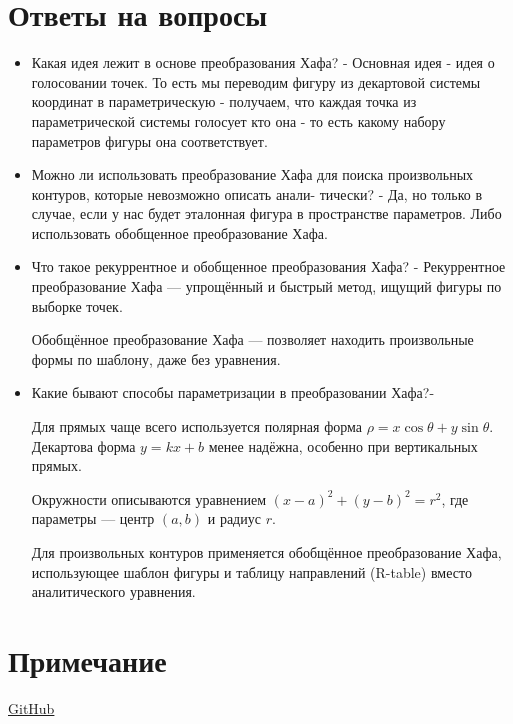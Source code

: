 \documentclass[a4paper,12pt]{article}
\begin{document}
	\section{Ответы на вопросы}
	\begin{itemize}
		\item Какая идея лежит в основе преобразования Хафа?
		- Основная идея - идея о голосовании точек. То есть мы переводим фигуру из декартовой системы координат в параметрическую - получаем, что каждая точка из параметрической системы голосует кто она - то есть какому набору параметров фигуры она соответствует.
		
		\item Можно ли использовать преобразование Хафа для поиска
		произвольных контуров, которые невозможно описать анали-
		тически? - Да, но только в случае, если у нас будет эталонная фигура в пространстве параметров. Либо использовать обобщенное преобразование Хафа.
		
		\item Что такое рекуррентное и обобщенное преобразования Хафа? - Рекуррентное преобразование Хафа — упрощённый и быстрый метод, ищущий фигуры по выборке точек.
		
		Обобщённое преобразование Хафа — позволяет находить произвольные формы по шаблону, даже без уравнения.
		
		\item Какие бывают способы параметризации в преобразовании Хафа?-
		
		 Для прямых чаще всего используется полярная форма \( \rho = x \cos\theta + y \sin\theta \). Декартова форма \( y = kx + b \) менее надёжна, особенно при вертикальных прямых.
		
		Окружности описываются уравнением \( (x - a)^2 + (y - b)^2 = r^2 \), где параметры — центр \( (a, b) \) и радиус \( r \).
		
		Для произвольных контуров применяется обобщённое преобразование Хафа, использующее шаблон фигуры и таблицу направлений (R-table) вместо аналитического уравнения. 
	\end{itemize}
	
	\section{Примечание}
	\href{https://github.com/decadeos/ITMO/tree/master/2_course/texViz/lab5}{GitHub}
\end{document}

